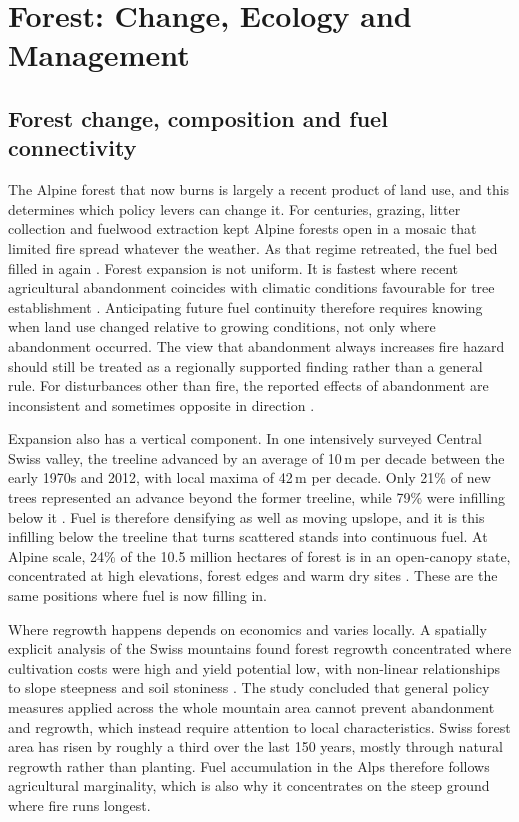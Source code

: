 \documentclass[11pt,a4paper]{article}
\begin{document}
\section{Forest: Change, Ecology and Management}
\label{sec:forest}

\subsection{Forest change, composition and fuel connectivity}

The Alpine forest that now burns is largely a recent product of land use, and this determines which policy levers can change it. For centuries, grazing, litter collection and fuelwood extraction kept Alpine forests open in a mosaic that limited fire spread whatever the weather. As that regime retreated, the fuel bed filled in again \citep{bebi_changes_2017}. Forest expansion is not uniform. It is fastest where recent agricultural abandonment coincides with climatic conditions favourable for tree establishment \citep{garbarino_contrasting_2020}. Anticipating future fuel continuity therefore requires knowing when land use changed relative to growing conditions, not only where abandonment occurred. The view that abandonment always increases fire hazard should still be treated as a regionally supported finding rather than a general rule. For disturbances other than fire, the reported effects of abandonment are inconsistent and sometimes opposite in direction \citep{mantero_influence_2020}.

Expansion also has a vertical component. In one intensively surveyed Central Swiss valley, the treeline advanced by an average of 10\,m per decade between the early 1970s and 2012, with local maxima of 42\,m per decade. Only 21\% of new trees represented an advance beyond the former treeline, while 79\% were infilling below it \citep{frei_evidence_2023}. Fuel is therefore densifying as well as moving upslope, and it is this infilling below the treeline that turns scattered stands into continuous fuel. At Alpine scale, 24\% of the 10.5 million hectares of forest is in an open-canopy state, concentrated at high elevations, forest edges and warm dry sites \citep{stritih_alternative_2023}. These are the same positions where fuel is now filling in.

Where regrowth happens depends on economics and varies locally. A spatially explicit analysis of the Swiss mountains found forest regrowth concentrated where cultivation costs were high and yield potential low, with non-linear relationships to slope steepness and soil stoniness \citep{gellrich_agricultural_2007}. The study concluded that general policy measures applied across the whole mountain area cannot prevent abandonment and regrowth, which instead require attention to local characteristics. Swiss forest area has risen by roughly a third over the last 150 years, mostly through natural regrowth rather than planting. Fuel accumulation in the Alps therefore follows agricultural marginality, which is also why it concentrates on the steep ground where fire runs longest.
\end{document}
